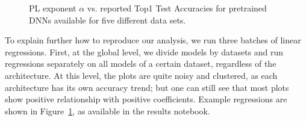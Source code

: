 \begin{figure}[t]
{        \label{fig:svhn.alpha}
    }
    \qquad
    \caption{%
             PL exponent $\alpha$ vs. reported Top1 Test Accuracies for pretrained DNNs available for five different data sets.
            }
    \label{fig:DSalphas}
\end{figure}

To explain further how to reproduce our analysis, we run three batches of linear regressions. 
First, at the global level, we divide models by datasets and run regressions separately on all models of a certain dataset, regardless of the architecture. 
At this level, the plots are quite noisy and clustered, as each architecture has its own accuracy trend; but one can
 still see that most plots show positive relationship with positive coefficients. 
Example regressions are shown in Figure~\ref{fig:DSalphas}, as available in the results notebook.
 
